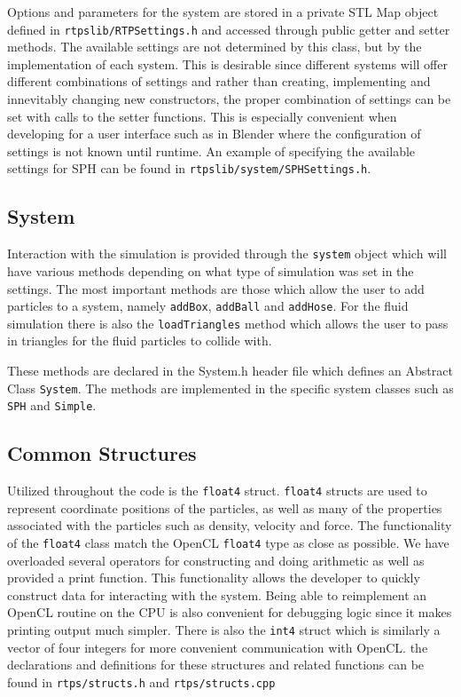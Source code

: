 Options and parameters for the system are stored in a private STL Map object
defined in \verb|rtpslib/RTPSettings.h| and accessed through public getter and
setter methods. The available settings are not determined by this class, but by
the implementation of each system. This is desirable since different systems
will offer different combinations of settings and rather than creating,
implementing and innevitably changing new constructors, the proper combination
of settings can be set with calls to the setter functions. This is especially
convenient when developing for a user interface such as in Blender where the
configuration of settings is not known until runtime.  
An example of specifying the available settings for SPH can be found in
\verb|rtpslib/system/SPHSettings.h|.


\subsection{System}

Interaction with the simulation is provided through the \verb|system| object which
will have various methods depending on what type of simulation was set in the
settings. The most important methods are those which allow the user to add
particles to a system, namely \verb|addBox|, \verb|addBall| and \verb|addHose|. For the fluid
simulation there is also the \verb|loadTriangles| method which allows the user to
pass in triangles for the fluid particles to collide with.

These methods are declared in the System.h header file which defines an
Abstract Class \verb|System|. The methods are implemented in the specific system
classes such as \verb|SPH| and \verb|Simple|.

\subsection{Common Structures}

Utilized throughout the code is the \verb|float4| struct. \verb|float4| structs are used
to represent coordinate positions of the particles, as well as many of the
properties associated with the particles such as density, velocity and force.
The functionality of the \verb|float4| class match the OpenCL \verb|float4| type as close
as possible. We have overloaded several operators for constructing and doing
arithmetic as well as provided a print function. This functionality allows the
developer to quickly construct data for interacting with the system. Being able
to reimplement an OpenCL routine on the CPU is also convenient for debugging
logic since it makes printing output much simpler. 
There is also the \verb|int4| struct which is similarly a vector of four integers
for more convenient communication with OpenCL.
the declarations and definitions for these structures and related functions can
be found in \verb|rtps/structs.h| and \verb|rtps/structs.cpp|


